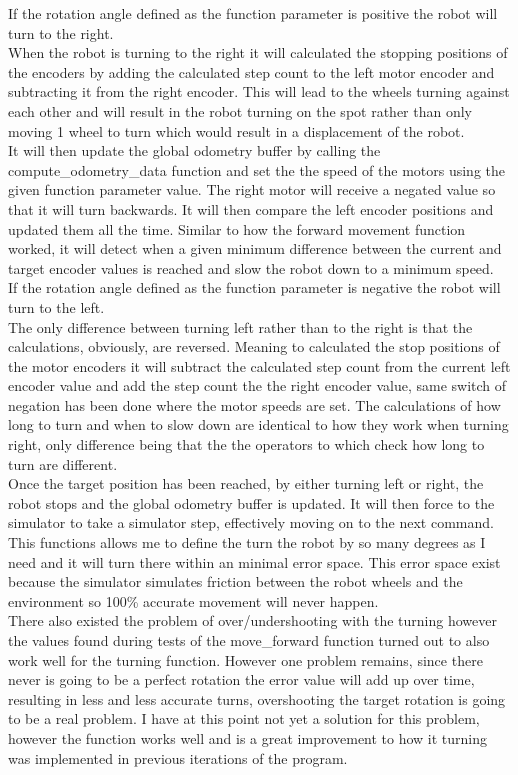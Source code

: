 \documentclass[10pt,a4paper]{article}
\begin{document}
\begin{flushleft}
If the rotation angle defined as the function parameter is positive the robot will turn to the right.\\
When the robot is turning to the right it will calculated the stopping positions of the encoders by adding the calculated step count to the left motor encoder and subtracting it from the right encoder. This will lead to the wheels turning against each other and will result in the robot turning on the spot rather than only moving 1 wheel to turn which would result in a displacement of the robot. \\
It will then update the global odometry buffer by calling the compute\_odometry\_data function and set the the speed of the motors using the given function parameter value. The right motor will receive a negated value so that it will turn backwards. 
It will then compare the left encoder positions and updated them all the time. Similar to how the forward movement function worked, it will detect when a given minimum difference between the current and target encoder values is reached and slow the robot down to a minimum speed. \\[3ex]

If the rotation angle defined as the function parameter is negative the robot will turn to the left.\\
The only difference between turning left rather than to the right is that the calculations, obviously, are reversed. Meaning to calculated the stop positions of the motor encoders it will subtract the calculated step count from the current left encoder value and add the step count the the right
encoder value, same switch of negation has been done where the motor speeds are set.
The calculations of how long to turn and when to slow down are identical to how they work when turning right, only difference being that the the operators to which check how long to turn are different.\\
Once the target position has been reached, by either turning left or right, the robot stops and the global odometry buffer is updated. 
It will then force to the simulator to take a simulator step, effectively moving on to the next command.\\[3ex]

This functions allows me to define the turn the robot by so many degrees as I need and it will turn there within an minimal error space. This error space exist because the simulator simulates friction between the robot wheels and the environment so 100\% accurate movement will never happen.\\
There also existed the problem of over/undershooting with the turning however the values found during tests of the move\_forward function turned out to also work well for the turning function. However one problem remains, since there never is going to be a perfect rotation the error value will add up over time, resulting in less and less accurate turns, overshooting the target rotation is going to be a real problem. I have at this point not yet a solution for this problem, however the function works well and is a great improvement to how it turning was implemented in previous iterations of the program.


\end{flushleft}
\end{document}
